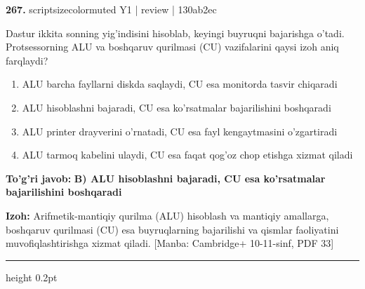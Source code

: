 \documentclass[10pt,a4paper]{article}
\begin{document}
{\bfseries\sffamily\color{ink} 267.} {scriptsizecolor{muted} Y1 | review | 130ab2ec}
\par
Dastur ikkita sonning yig'indisini hisoblab, keyingi buyruqni bajarishga o'tadi. Protsessorning ALU va boshqaruv qurilmasi (CU) vazifalarini qaysi izoh aniq farqlaydi?
\begin{enumerate}[label=\Alph*),leftmargin=9mm]
\item ALU barcha fayllarni diskda saqlaydi, CU esa monitorda tasvir chiqaradi
\item ALU hisoblashni bajaradi, CU esa ko'rsatmalar bajarilishini boshqaradi
\item ALU printer drayverini o'rnatadi, CU esa fayl kengaytmasini o'zgartiradi
\item ALU tarmoq kabelini ulaydi, CU esa faqat qog'oz chop etishga xizmat qiladi
\end{enumerate}
\begin{tcolorbox}[enhanced,breakable,colback=teal!4,colframe=teal!60!black,boxrule=0.45pt,arc=1.2mm,left=2.7mm,right=2.7mm,top=1.8mm,bottom=1.8mm,before skip=2mm,after skip=2mm]
{\bfseries\sffamily\color{teal}To'g'ri javob:} \textbf{B) ALU hisoblashni bajaradi, CU esa ko'rsatmalar bajarilishini boshqaradi}
\par\smallskip
{\bfseries Izoh:} Arifmetik-mantiqiy qurilma (ALU) hisoblash va mantiqiy amallarga, boshqaruv qurilmasi (CU) esa buyruqlarning bajarilishi va qismlar faoliyatini muvofiqlashtirishga xizmat qiladi. [Manba: Cambridge+ 10-11-sinf, PDF 33]
\end{tcolorbox}
\vspace{2mm}\hrule height 0.2pt\vspace{3mm}
\end{document}
